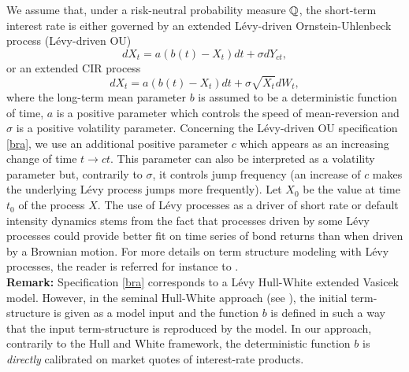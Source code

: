  We assume that, under a risk-neutral probability measure $\mathbb{Q}$, the  short-term interest rate is either governed by  an extended L\'evy-driven Ornstein-Uhlenbeck process (L\'evy-driven OU)
  \begin{equation}
\label{bra}
dX_t = a(b(t) - X_t)dt + \sigma dY_{ct},
\end{equation}
or an extended CIR process  %
\begin{equation}
\label{cir}
dX_t = a(b(t) - X_t)dt + \sigma \sqrt{X_t} dW_{t},
\end{equation}
where the long-term mean parameter $b$ is assumed to be a deterministic function of time, $a$ is a positive parameter which controls the speed of mean-reversion and $\sigma$ is a positive volatility parameter. %
Concerning the L\'evy-driven OU specification \ref{bra}, we use an additional positive parameter $c$ 
which appears as an increasing  change of time $t \rightarrow ct$. This parameter can also be interpreted as a volatility parameter but, contrarily to $\sigma$, it controls jump frequency (an increase of $c$ makes the underlying L\'evy process jumps more frequently). Let $X_0$ be the value at time $t_0$ of the process $X$.  The use of L\'evy processes as a driver of short rate or default intensity dynamics stems from the fact that processes driven by some L\'evy processes could provide better fit on time series of bond returns than when driven by a Brownian motion. For more details on  term structure modeling with L\'evy processes, the reader is referred for instance to  \cite{Cariboni2004,Crepey2012,Eberlein1999,Kluge2005}.\\

\textbf{Remark: }
Specification \ref{bra} corresponds to a L\'evy Hull-White extended Vasicek model. However, in the seminal Hull-White approach (see \cite{Hull1990}), the initial term-structure is given as a model input  and the function $b$ is defined in such a way that the input term-structure is reproduced by the model. In our approach, contrarily to the Hull and White framework, the deterministic function $b$ is \emph{directly} calibrated on market quotes of interest-rate products.

